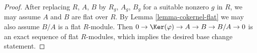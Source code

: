 \begin{proof}
\medskip\noindent
After replacing $R$, $A$, $B$ by $R_g$, $A_g$, $B_g$ for a suitable
nonzero $g$ in $R$, we may assume $A$ and $B$ are flat over $R$.
By Lemma \ref{lemma-cokernel-flat}
we may also assume $B/A$ is a flat $R$-module.
Then $0 \to \Ker(\varphi) \to A \to B \to B/A \to 0$
is an exact sequence of flat $R$-modules, which implies
the desired base change statement.
\end{proof}